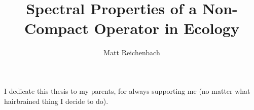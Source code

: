 \documentclass[final]{nuthesis}
\theoremstyle{definition}
\numberwithin{theorem}{section}
\numberwithin{lemma}{section}
\numberwithin{corollary}{section}
\numberwithin{definition}{section}
\numberwithin{equation}{section}
\begin{document}
\frontmatter

\title{Spectral Properties of a Non-Compact Operator in Ecology}
\author{Matt Reichenbach}
\maketitle



\begin{dedication}
    I dedicate this thesis to my parents, for always supporting me (no matter what hairbrained thing I decide to do).
\end{dedication}
\end{document}
